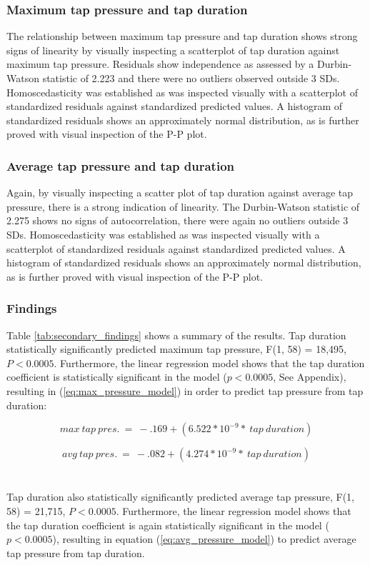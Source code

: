 \documentclass{sigchi}
\begin{document}
\subsubsection{Maximum tap pressure and tap duration}
The relationship between maximum tap pressure and tap duration shows strong signs of linearity by visually inspecting a scatterplot of tap duration against maximum tap pressure. Residuals show independence as assessed by a Durbin-Watson statistic of 2.223 and there were no outliers observed outside 3 SDs. Homoscedasticity was established as was inspected visually with a scatterplot of standardized residuals against standardized predicted values. A histogram of standardized residuals shows an approximately normal distribution, as is further proved with visual inspection of the P-P plot.

\subsubsection{Average tap pressure and tap duration}
Again, by visually inspecting a scatter plot of tap duration against average tap pressure, there is a strong indication of linearity. The Durbin-Watson statistic of 2.275 shows no signs of autocorrelation, there were again no outliers outside 3 SDs. Homoscedasticity was established as was inspected visually with a scatterplot of standardized residuals against standardized predicted values. A histogram of standardized residuals shows an approximately normal distribution, as is further proved with visual inspection of the P-P plot.

\subsubsection{Findings}

Table \ref{tab:secondary_findings} shows a summary of the results. Tap duration statistically significantly predicted maximum tap pressure, F(1, 58) = 18,495, $P < 0.0005$. Furthermore, the linear regression model shows that the tap duration coefficient is statistically significant in the model ($p < 0.0005$, See Appendix), resulting in (\ref{eq:max_pressure_model}) in order to predict tap pressure from tap duration:

\begin{equation}
max\ tap\ pres.\ =\ -.169 + (6.522*10^{-9} *\ tap\ duration)
\label{eq:max_pressure_model}
\end{equation}

\begin{equation}
avg\ tap\ pres.\ =\ -.082 + (4.274*10^{-9} *\ tap\ duration)
\label{eq:avg_pressure_model}
\end{equation}
\\\\
Tap duration also statistically significantly predicted average tap pressure, F(1, 58) = 21,715, $P < 0.0005$. Furthermore, the linear regression model shows that the tap duration coefficient is again statistically significant in the model ($p < 0.0005$), resulting in equation (\ref{eq:avg_pressure_model}) to predict average tap pressure from tap duration.
\end{document}
